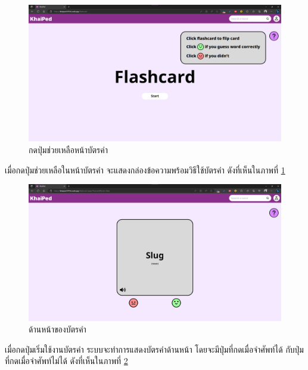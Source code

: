 \documentclass[12pt,oneside,openright,a4paper]{cpe-thai-project}
\begin{document}
\pagebreak
\begin{figure}[!h]\centering
	\includegraphics[width=\textwidth, keepaspectratio=true]{image/chap4/UI/flashcard/flashcard help.png}
	\caption{{กดปุ่มช่วยเหลือหน้าบัตรคำ}}\label{fig:chap4UIFlashHelp}
\end{figure}
\hspace{1cm}
เมื่อกดปุ่มช่วยเหลือในหน้าบัตรคำ จะแสดงกล่องข้อความพร้อมวิธีใช้บัตรคำ ดังที่เห็นในภาพที่ \ref{fig:chap4UIFlashHelp}

\begin{figure}[!h]\centering
	\includegraphics[width=\textwidth, keepaspectratio=true]{image/chap4/UI/flashcard/front.png}
	\caption{{ด้านหน้าของบัตรคำ}}\label{fig:chap4UIFlashFront}
\end{figure}
\hspace{1cm}
เมื่อกดปุ่มเริ่มใช้งานบัตรคำ ระบบจะทำการแสดงบัตรคำด้านหน้า โดยจะมีปุ่มที่กดเมื่อจำศัพท์ได้ กับปุ่มที่กดเมื่อจำศัพท์ไม่ได้
ดังที่เห็นในภาพที่ \ref{fig:chap4UIFlashFront}
\end{document}
